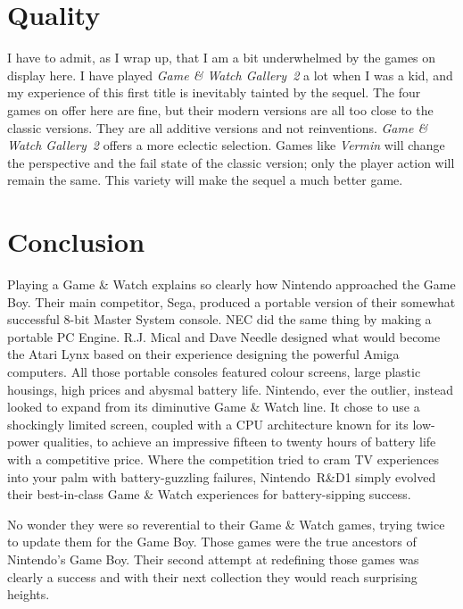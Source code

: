 \documentclass{book}
\begin{document}
\FloatBarrier\needspace{10mm}\section*{Quality}\nopagebreak[4]

I have to admit, as I wrap up, that I am a bit underwhelmed by the games on display here. I have played \emph{Game \& Watch Gallery 2} a lot when I was a kid, and my experience of this first title is inevitably tainted by the sequel. The four games on offer here are fine, but their modern versions are all too close to the classic versions. They are all additive versions and not reinventions. \emph{Game \& Watch Gallery 2} offers a more eclectic selection. Games like \emph{Vermin} will change the perspective and the fail state of the classic version; only the player action will remain the same. This variety will make the sequel a much better game.

\FloatBarrier\needspace{10mm}\section*{Conclusion}\nopagebreak[4]

Playing a Game \& Watch explains so clearly how Nintendo approached the Game Boy. Their main competitor, Sega, produced a portable version of their somewhat successful 8-bit Master System console. NEC did the same thing by making a portable PC Engine. R.J. Mical and Dave Needle designed what would become the Atari Lynx based on their experience designing the powerful Amiga computers. All those portable consoles featured colour screens, large plastic housings, high prices and abysmal battery life. Nintendo, ever the outlier, instead looked to expand from its diminutive Game \& Watch line. It chose to use a shockingly limited screen, coupled with a CPU architecture known for its low-power qualities, to achieve an impressive fifteen to twenty hours of battery life with a competitive price. Where the competition tried to cram TV experiences into your palm with battery-guzzling failures, Nintendo R\&D1 simply evolved their best-in-class Game \& Watch experiences for battery-sipping success.

No wonder they were so reverential to their Game \& Watch games, trying twice to update them for the Game Boy. Those games were the true ancestors of Nintendo’s Game Boy. Their second attempt at redefining those games was clearly a success and with their next collection they would reach surprising heights.
\end{document}
